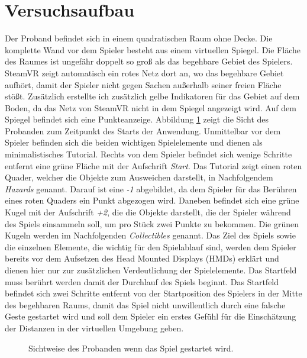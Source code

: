 \section{Versuchsaufbau}
Der Proband befindet sich in einem quadratischen Raum ohne Decke. Die komplette Wand vor dem Spieler besteht aus einem virtuellen Spiegel. Die Fläche des Raumes ist ungefähr doppelt so groß als das begehbare Gebiet des Spielers. SteamVR zeigt automatisch ein rotes Netz dort an, wo das begehbare Gebiet aufhört, damit der Spieler nicht gegen Sachen außerhalb seiner freien Fläche stößt. Zusätzlich erstellte ich zusätzlich gelbe Indikatoren für das Gebiet auf dem Boden, da das Netz von SteamVR nicht in dem Spiegel angezeigt wird. Auf dem Spiegel befindet sich eine Punkteanzeige.
Abbildung \ref{fig:povSetup} zeigt die Sicht des Probanden zum Zeitpunkt des Starts der Anwendung. Unmittelbar vor dem Spieler befinden sich die beiden wichtigen Spielelemente und dienen als minimalistisches Tutorial. Rechts von dem Spieler befindet sich wenige Schritte entfernt eine grüne Fläche mit der Aufschrift \textit{Start}. Das Tutorial zeigt einen roten Quader, welcher die Objekte zum Ausweichen darstellt, in Nachfolgendem \textit{Hazards} genannt. Darauf ist eine \textit{-1} abgebildet, da dem Spieler für das Berühren eines roten Quaders ein Punkt abgezogen wird. Daneben befindet sich eine grüne Kugel mit der Aufschrift \textit{+2}, die die Objekte darstellt, die der Spieler während des Spiels einsammeln soll, um pro Stück zwei Punkte zu bekommen. Die grünen Kugeln werden im Nachfolgenden \textit{Collectibles} genannt. Das Ziel des Spiels sowie die einzelnen Elemente, die wichtig für den Spielablauf sind, werden dem Spieler bereits vor dem Aufsetzen des Head Mounted Displays (HMDs) erklärt und dienen hier nur zur zusätzlichen Verdeutlichung der Spielelemente. 
Das Startfeld muss berührt werden damit der Durchlauf des Spiels beginnt. Das Startfeld befindet sich zwei Schritte entfernt von der Startposition des Spielers in der Mitte des begehbaren Raums, damit das Spiel nicht unwillentlich durch eine falsche Geste gestartet wird und soll dem Spieler ein erstes Gefühl für die Einschätzung der Distanzen in der virtuellen Umgebung geben.

\begin{figure}[h]
  \caption[Aktuelles Setup der Anwendung]{Sichtweise des Probanden wenn das Spiel gestartet wird.}
  \label{fig:povSetup}
\end{figure}

